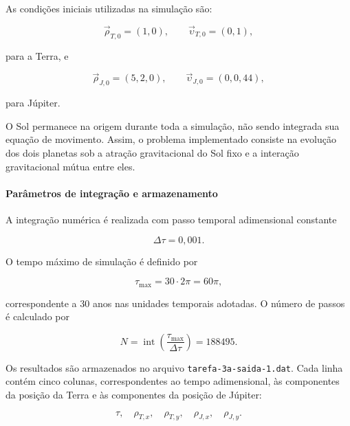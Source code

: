\documentclass[12pt,a4paper]{article}
\begin{document}
As condições iniciais utilizadas na simulação são:

\begin{equation}
    \vec{\rho}_{T,0}=(1,0),
    \qquad
    \vec{\upsilon}_{T,0}=(0,1),
\end{equation}

para a Terra, e

\begin{equation}
    \vec{\rho}_{J,0}=(5,2,0),
    \qquad
    \vec{\upsilon}_{J,0}=(0,0,44),
\end{equation}

para Júpiter.

O Sol permanece na origem durante toda a simulação, não sendo integrada sua equação de movimento. Assim, o problema implementado consiste na evolução dos dois planetas sob a atração gravitacional do Sol fixo e a interação gravitacional mútua entre eles.

\paragraph{Parâmetros de integração e armazenamento}

A integração numérica é realizada com passo temporal adimensional constante

\begin{equation}
    \Delta\tau=0,001.
\end{equation}

O tempo máximo de simulação é definido por

\begin{equation}
    \tau_{\max}=30\cdot2\pi=60\pi,
\end{equation}

correspondente a 30 anos nas unidades temporais adotadas. O número de passos é calculado por

\begin{equation}
    N=\operatorname{int}
    \left(\frac{\tau_{\max}}{\Delta\tau}\right)
    =188495.
\end{equation}

Os resultados são armazenados no arquivo \texttt{tarefa-3a-saida-1.dat}. Cada linha contém cinco colunas, correspondentes ao tempo adimensional, às componentes da posição da Terra e às componentes da posição de Júpiter:

\begin{equation}
    \tau,\quad
    \rho_{T,x},\quad
    \rho_{T,y},\quad
    \rho_{J,x},\quad
    \rho_{J,y}.
\end{equation}
\end{document}
